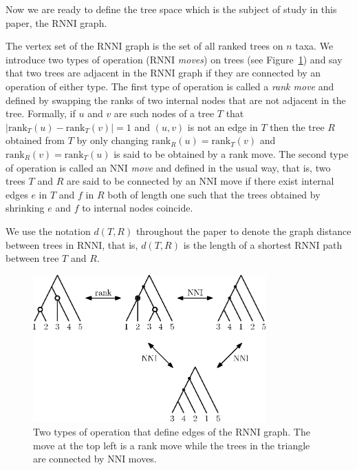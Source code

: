 \documentclass{amsart}
\newcommand{\rank}{\mathrm{rank}}
\newcommand{\nni}{\mathrm{NNI}}
\newcommand{\rnni}{\mathrm{RNNI}}
\begin{document}
Now we are ready to define the tree space which is the subject of study in this paper, the $\rnni$ graph.

The vertex set of the $\rnni$ graph is the set of all ranked trees on $n$ taxa.
We introduce two types of operation ($\rnni$ \emph{moves}) on trees (see Figure~\ref{fig:RNNI}) and say that two trees are adjacent in the $\rnni$ graph if they are connected by an operation of either type.
The first type of operation is called a \emph{rank move} and defined by swapping the ranks of two internal nodes that are not adjacent in the tree.
Formally, if $u$ and $v$ are such nodes of a tree $T$ that $|\rank_T(u) - \rank_T(v)| = 1$ and $(u, v)$ is not an edge in $T$ then the tree $R$ obtained from $T$ by only changing $\rank_R(u) = \rank_T(v)$ and $\rank_R(v) = \rank_T(u)$ is said to be obtained by a rank move.
The second type of operation is called an $\nni$ \emph{move} and defined in the usual way, that is, two trees $T$ and $R$ are said to be connected by an $\nni$ move if there exist internal edges $e$ in $T$ and $f$ in $R$ both of length one such that the trees obtained by shrinking $e$ and $f$ to internal nodes coincide.

We use the notation $d(T, R)$ throughout the paper to denote the graph distance between trees in $\rnni$, that is, $d(T, R)$ is the length of a shortest $\rnni$ path between tree $T$ and $R$.

\begin{figure}[H]
\centering
\includegraphics[width=0.8\textwidth]{RNNI}
\vspace{12pt}
\caption{Two types of operation that define edges of the $\rnni$ graph.
The move at the top left is a rank move while the trees in the triangle are connected by $\nni$ moves.}
\label{fig:RNNI}
\end{figure}

\end{document}
